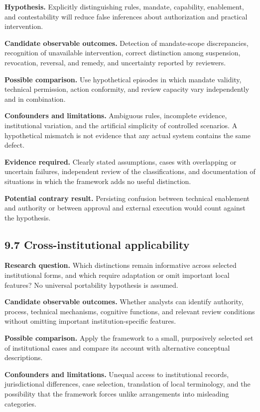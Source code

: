 \documentclass[
  10pt,
]{article}
\begin{document}
\textbf{Hypothesis.} Explicitly distinguishing rules, mandate,
capability, enablement, and contestability will reduce false inferences
about authorization and practical intervention.

\textbf{Candidate observable outcomes.} Detection of mandate-scope
discrepancies, recognition of unavailable intervention, correct
distinction among suspension, revocation, reversal, and remedy, and
uncertainty reported by reviewers.

\textbf{Possible comparison.} Use hypothetical episodes in which mandate
validity, technical permission, action conformity, and review capacity
vary independently and in combination.

\textbf{Confounders and limitations.} Ambiguous rules, incomplete
evidence, institutional variation, and the artificial simplicity of
controlled scenarios. A hypothetical mismatch is not evidence that any
actual system contains the same defect.

\textbf{Evidence required.} Clearly stated assumptions, cases with
overlapping or uncertain failures, independent review of the
classifications, and documentation of situations in which the framework
adds no useful distinction.

\textbf{Potential contrary result.} Persisting confusion between
technical enablement and authority or between approval and external
execution would count against the hypothesis.

\subsection{9.7 Cross-institutional
applicability}\label{cross-institutional-applicability}

\textbf{Research question.} Which distinctions remain informative across
selected institutional forms, and which require adaptation or omit
important local features? No universal portability hypothesis is
assumed.

\textbf{Candidate observable outcomes.} Whether analysts can identify
authority, process, technical mechanisms, cognitive functions, and
relevant review conditions without omitting important
institution-specific features.

\textbf{Possible comparison.} Apply the framework to a small,
purposively selected set of institutional cases and compare its account
with alternative conceptual descriptions.

\textbf{Confounders and limitations.} Unequal access to institutional
records, jurisdictional differences, case selection, translation of
local terminology, and the possibility that the framework forces unlike
arrangements into misleading categories.
\end{document}
